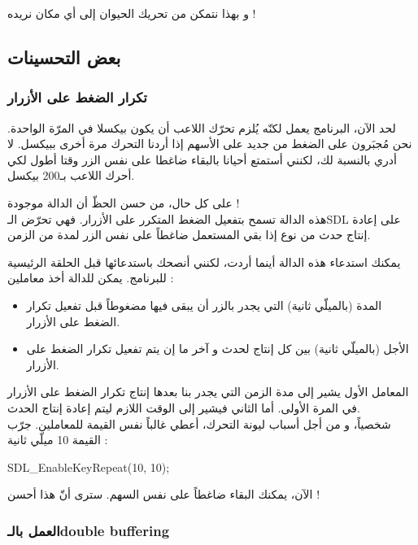 و بهذا نتمكن من تحريك الحيوان إلى أي مكان نريده !


\subsection{بعض التحسينات}

\subsubsection{تكرار الضغط على الأزرار}

لحد الآن، البرنامج يعمل لكنّه يُلزم تحرّك اللاعب أن يكون بيكسلا في المرّة الواحدة. نحن مُجبَرون على الضغط من جديد على الأسهم إذا أردنا التحرك مرة أخرى ببيكسل. لا أدري بالنسبة لك، لكنني أستمتع أحيانا بالبقاء ضاغطا على نفس الزر وقتا أطول لكي أحرك اللاعب بـ200 بيكسل.

على كل حال، من حسن الحظّ أن الدالة 
موجودة !\\
هذه الدالة تسمح بتفعيل الضغط المتكرر على الأزرار. فهي تحرّض الـ\textenglish{SDL}
على إعادة إنتاج حدث من نوع
إذا بقي المستعمل ضاغطاً على نفس الزر لمدة من الزمن.

يمكنك استدعاء هذه الدالة أينما أردت، لكنني أنصحك باستدعائها قبل الحلقة الرئيسية للبرنامج. يمكن للدالة أخذ معاملين :

\begin{itemize}
	\item المدة (بالميلّي ثانية) التي يجدر بالزر أن يبقى فيها مضغوطاً قبل تفعيل تكرار الضغط على الأزرار.
	\item الأجل (بالميلّي ثانية) بين كل إنتاج لحدث
	و آخر ما إن يتم تفعيل تكرار الضغط على الأزرار.
\end{itemize}

المعامل الأول يشير إلى مدة الزمن التي يجدر بنا بعدها إنتاج تكرار الضغط على الأزرار في المرة الأولى. أما الثاني فيشير إلى الوقت اللازم ليتم إعادة إنتاج الحدث.\\
شخصياً، و من أجل أسباب ليونة التحرك، أعطي غالباً نفس القيمة للمعاملين. جرّب القيمة 10 ميلّي ثانية :

\begin{Csource}
SDL_EnableKeyRepeat(10, 10);
\end{Csource}

الآن، يمكنك البقاء ضاغطاً على نفس السهم. سترى أنّ هذا أحسن !

\subsubsection{العمل بالـ\textenglish{double buffering}}

